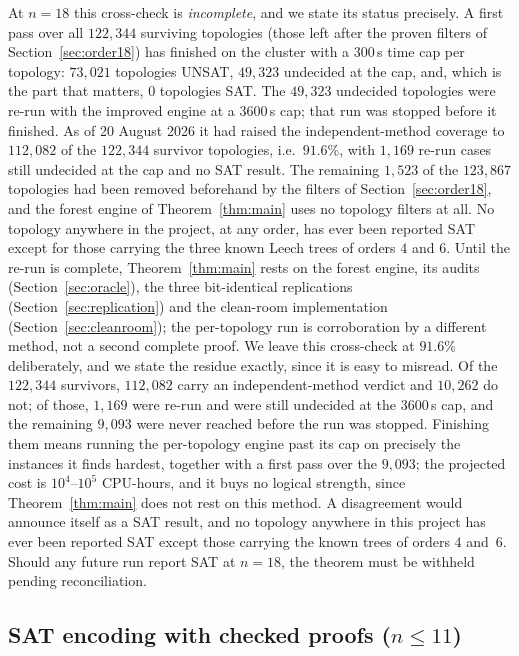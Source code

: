 \documentclass[11pt,a4paper]{article}
\theoremstyle{plain}
\theoremstyle{remark}
\begin{document}
At $n=18$ this cross-check is \emph{incomplete}, and we state its status
precisely.  A first pass over all $122{,}344$ surviving topologies (those left
after the proven filters of Section~\ref{sec:order18}) has finished on the
cluster with a $300$\,s time cap per topology: $73{,}021$ topologies UNSAT,
$49{,}323$ undecided at the cap, and, which is the part that matters, $0$
topologies SAT.  The $49{,}323$ undecided topologies were re-run with the
improved engine at a $3600$\,s cap; that run was stopped before it finished.
As of 20 August 2026 it had raised the independent-method coverage to
$112{,}082$ of the $122{,}344$ survivor topologies, i.e.\ $91.6\%$, with
$1{,}169$ re-run cases still undecided at the cap and no SAT result.  The
remaining $1{,}523$ of the $123{,}867$ topologies had been removed beforehand by
the filters of Section~\ref{sec:order18}, and the forest engine of
Theorem~\ref{thm:main} uses no topology filters at all.  No topology anywhere in
the project, at any order, has ever been reported SAT except for those carrying
the three known Leech trees of orders $4$ and $6$.  Until the
re-run is complete, Theorem~\ref{thm:main} rests on the forest engine, its
audits (Section~\ref{sec:oracle}), the three bit-identical replications
(Section~\ref{sec:replication}) and the clean-room implementation
(Section~\ref{sec:cleanroom}); the per-topology run is corroboration by a
different method, not a second complete proof.
We leave this cross-check at $91.6\%$ deliberately, and we state the residue
exactly, since it is easy to misread.  Of the $122{,}344$ survivors,
$112{,}082$ carry an independent-method verdict and $10{,}262$ do not; of those,
$1{,}169$ were re-run and were still undecided at the $3600$\,s cap, and the
remaining $9{,}093$ were never reached before the run was stopped.  Finishing
them means running the per-topology engine past its cap on precisely the
instances it finds hardest, together with a first pass over the $9{,}093$; the
projected cost is $10^4$--$10^5$ CPU-hours, and it buys no logical strength,
since
Theorem~\ref{thm:main} does not rest on this method.  A disagreement would
announce itself as a SAT result, and no topology anywhere in this project has
ever been reported SAT except those carrying the known trees of orders $4$
and~$6$.  Should any future run report SAT at $n=18$, the theorem must be
withheld pending reconciliation.

\subsection{SAT encoding with checked proofs
  (\texorpdfstring{$n\le 11$}{n <= 11})}\label{sec:sat}
\end{document}
